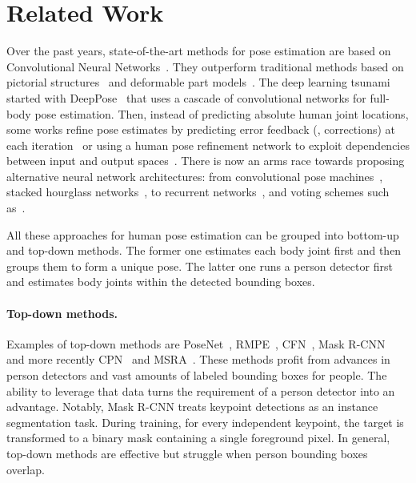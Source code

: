 \documentclass[10pt,twocolumn,letterpaper]{article}
\begin{document}
\section{Related Work}

Over the past years, state-of-the-art methods for pose estimation are based on
Convolutional Neural Networks~\cite{he2017mask,partsaffinityfields,newell2017associative,personlab}.
They outperform traditional methods based on pictorial
structures~\cite{felzenszwalb2005pictorial,dantone2013human,eichner20122d} and
deformable part models~\cite{felzenszwalb2010object}. The deep learning tsunami
started with DeepPose~\cite{toshev2014deeppose} that uses a cascade of convolutional
networks for full-body pose estimation. Then, instead of predicting absolute human
joint locations, some works refine pose estimates by predicting error
feedback (\ie, corrections) at each iteration~\cite{carreira2015human,haque2016towards} or using a
human pose refinement network to exploit dependencies between input and output
spaces~\cite{Fieraru2018LearningTR}. There is now an arms race towards proposing
alternative neural network architectures: from convolutional pose
machines~\cite{wei2016convolutional}, stacked hourglass
networks~\cite{newell2016stacked, Luo2019MultiPersonPE}, to recurrent
networks~\cite{belagiannis2017recurrent}, and voting schemes
such as~\cite{lifshitz2016human}.

All these approaches for human pose estimation can be grouped into bottom-up and
top-down methods. The former one estimates each body joint first and then groups
them to form a unique pose. The latter one runs a person detector first and estimates
body joints within the detected bounding boxes.

\paragraph{Top-down methods.} Examples of top-down methods are
PoseNet~\cite{papandreou2017towards}, RMPE~\cite{Fang2017RMPERM},
CFN~\cite{Huang2017ACN}, Mask R-CNN~\cite{he2017mask,Detectron2018} and more recently
CPN~\cite{chen2018cascaded} and MSRA~\cite{xiao2018simple}. These methods profit from
advances in person detectors and vast amounts of labeled bounding boxes
for people. The ability to leverage that data turns the requirement of a
person detector into an advantage. Notably, Mask R-CNN treats keypoint detections as an
instance segmentation task. During training, for every independent keypoint, the target is
transformed to a binary mask containing a single foreground pixel. In general, top-down
methods are effective but struggle when person bounding boxes overlap.
\end{document}
